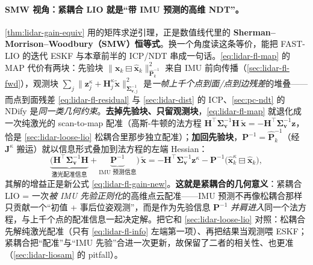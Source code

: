 \paragraph{SMW 视角：紧耦合 LIO 就是“带 IMU 预测的高维 NDT”。}
\cref{thm:lidar-gain-equiv} 用的矩阵求逆引理，正是数值线代里的 \textbf{Sherman–Morrison–Woodbury（SMW）恒等式}。换一个角度读这条等价\cite{gao2023slamad}，能把 FAST-LIO 的迭代 ESKF 与本章前半的 ICP/NDT 串成一句话。\cref{eq:lidar-fl-map} 的 MAP 代价有两块：先验块 $\|\mathbf{x}_k\boxminus\hat{\mathbf{x}}_k\|^2_{\hat{\mathbf{P}}_k^{-1}}$ 来自 IMU 前向传播（\cref{sec:lidar-fl-fwd}），观测块 $\sum_j\|\mathbf{z}^\kappa_j+\mathbf{H}^\kappa_j\tilde{\mathbf{x}}\|^2_{\boldsymbol\Sigma_{\mathbf{v},j}^{-1}}$ 是\emph{一帧上千个点到面/点到边残差}的堆叠——而点到面残差 \cref{eq:lidar-fl-residual} 与 \cref{sec:lidar-dist} 的 ICP、\cref{sec:pc-ndt} 的 NDify 是\emph{同一类几何约束}。\textbf{去掉先验块、只留观测块}，\cref{eq:lidar-fl-map} 就退化成一次纯激光的 scan-to-map 配准（高斯-牛顿的法方程 $\mathbf{H}^\top\boldsymbol\Sigma_{\mathbf{v}}^{-1}\mathbf{H}\,\tilde{\mathbf{x}}=-\mathbf{H}^\top\boldsymbol\Sigma_{\mathbf{v}}^{-1}\mathbf{z}$，恰是 \cref{sec:lidar-loose-lio} 松耦合里那步独立配准）；\textbf{加回先验块}，$\mathbf{P}^{-1}=\hat{\mathbf{P}}_k^{-1}$（经 $\mathbf{J}^\kappa$ 搬运）就以信息形式叠加到法方程的左端 Hessian：
\begin{equation}
  \underbrace{\big(\mathbf{H}^\top\boldsymbol\Sigma_{\mathbf{v}}^{-1}\mathbf{H}}_{\text{激光配准信息}}+\underbrace{\mathbf{P}^{-1}}_{\text{IMU 预测信息}}\big)\,\tilde{\mathbf{x}}=-\mathbf{H}^\top\boldsymbol\Sigma_{\mathbf{v}}^{-1}\mathbf{z}^\kappa-\mathbf{P}^{-1}\big(\hat{\mathbf{x}}^\kappa_k\boxminus\hat{\mathbf{x}}_k\big),
  \label{eq:lidar-fl-info}
\end{equation}
其解的增益正是新公式 \cref{eq:lidar-fl-gain-new}。\textbf{这就是紧耦合的几何意义}：紧耦合 LIO = 一次\emph{被 IMU 先验正则化}的高维点云配准——IMU 预测不再像松耦合那样只贡献一个“初值 + 事后位姿观测”，而是作为先验信息 $\mathbf{P}^{-1}$ \emph{并肩进入}同一个法方程，与上千个点的配准信息一起决定解。把它和 \cref{sec:lidar-loose-lio} 对照：松耦合先解纯激光配准（只有 \cref{eq:lidar-fl-info} 左端第一项）、再把结果当观测喂 ESKF；紧耦合把“配准”与“IMU 先验”合进一次更新，故保留了二者的相关性、也更准（\cref{sec:lidar-liosam} 的 pitfall）。

